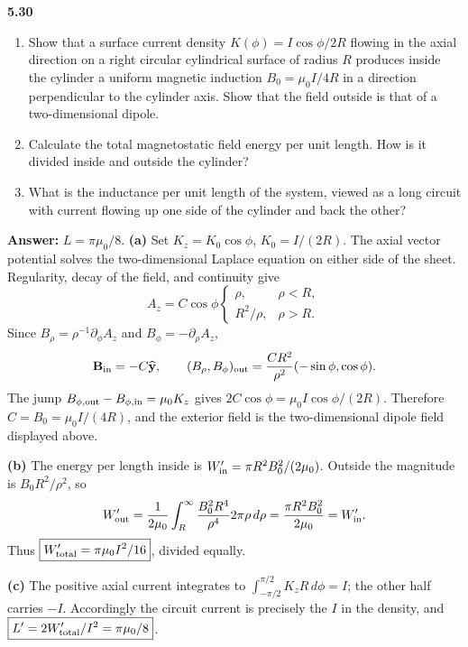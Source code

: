 \par\bigskip
\noindent\textbf{5.30}\quad\begin{enumerate}
\item[(a)] Show that a surface current density $K(\phi)=I\cos\phi/2R$ flowing in the axial direction on a right circular cylindrical surface of radius $R$ produces inside the cylinder a uniform magnetic induction $B_{0}=\mu_{0}I/4R$ in a direction perpendicular to the cylinder axis. Show that the field outside is that of a two-dimensional dipole.
\item[(b)] Calculate the total magnetostatic field energy per unit length. How is it divided inside and outside the cylinder?
\item[(c)] What is the inductance per unit length of the system, viewed as a long circuit with current flowing up one side of the cylinder and back the other?
\end{enumerate}
\textbf{Answer:} $L=\pi\mu_{0}/8$.
\solution
\textbf{(a)} Set $K_z=K_0\cos\phi$, $K_0=I/(2R)$.
The axial vector potential solves the two-dimensional Laplace
equation on either side of the sheet. Regularity, decay of the field,
and continuity give
\[
A_z=C\cos\phi\begin{cases}\rho,&\rho<R,\\R^2/\rho,&\rho>R.\end{cases}
\]
Since $B_\rho=\rho^{-1}\partial_\phi A_z$ and
$B_\phi=-\partial_\rho A_z$,
\[
\mathbf B_{\rm in}=-C\widehat{\mathbf y},\qquad
(B_\rho,B_\phi)_{\rm out}
=\frac{CR^2}{\rho^2}(-\sin\phi,\cos\phi).
\]
The jump $B_{\phi,\rm out}-B_{\phi,\rm in}=\mu_0K_z$ gives
$2C\cos\phi=\mu_0I\cos\phi/(2R)$.
Therefore $\boxed{C=B_0=\mu_0I/(4R)}$, and the exterior field is the
two-dimensional dipole field displayed above.

\textbf{(b)} The energy per length inside is
$W'_{\rm in}=\pi R^2B_0^2/(2\mu_0)$.
Outside the magnitude is $B_0R^2/\rho^2$, so
\[
W'_{\rm out}=\frac1{2\mu_0}\int_R^\infty
\frac{B_0^2R^4}{\rho^4}2\pi\rho\,d\rho
=\frac{\pi R^2B_0^2}{2\mu_0}=W'_{\rm in}.
\]
Thus $\boxed{W'_{\rm total}=\pi\mu_0I^2/16}$, divided equally.

\textbf{(c)} The positive axial current integrates to
$\int_{-\pi/2}^{\pi/2}K_zR\,d\phi=I$; the other half carries $-I$.
Accordingly the circuit current is precisely the $I$ in the density,
and
$\boxed{L'=2W'_{\rm total}/I^2=\pi\mu_0/8}$.


